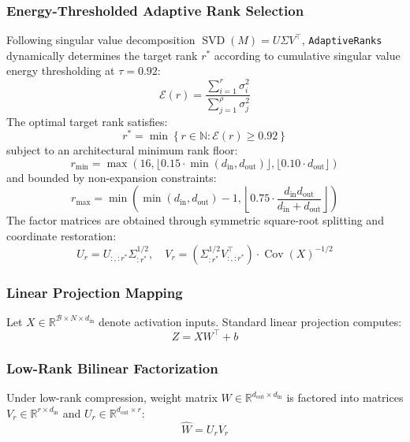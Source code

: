 \subsubsection{Energy-Thresholded Adaptive Rank Selection}
\label{sec:adaptive_rank_selection}
Following singular value decomposition $\operatorname{SVD}(M) = U \Sigma V^\top$, \texttt{AdaptiveRanks} dynamically determines the target rank $r^*$ according to cumulative singular value energy thresholding at $\tau = 0.92$:
\begin{equation}
\mathcal{E}(r) = \frac{\sum_{i=1}^r \sigma_i^2}{\sum_{j=1}^\rho \sigma_j^2}
\end{equation}
The optimal target rank satisfies:
\begin{equation}
r^* = \min \left\{ r \in \mathbb{N} : \mathcal{E}(r) \ge 0.92 \right\}
\end{equation}
subject to an architectural minimum rank floor:
\begin{equation}
r_{\min} = \max\left(16, \lfloor 0.15 \cdot \min(d_{\text{in}}, d_{\text{out}})\rfloor, \lfloor 0.10 \cdot d_{\text{out}}\rfloor\right)
\end{equation}
and bounded by non-expansion constraints:
\begin{equation}
r_{\max} = \min\left(\min(d_{\text{in}}, d_{\text{out}}) - 1, \left\lfloor 0.75 \cdot \frac{d_{\text{in}} d_{\text{out}}}{d_{\text{in}} + d_{\text{out}}}\right\rfloor\right)
\end{equation}
The factor matrices are obtained through symmetric square-root splitting and coordinate restoration:
\begin{equation}
U_r = U_{:, :r^*} \Sigma_{:r^*}^{1/2}, \quad V_r = \left(\Sigma_{:r^*}^{1/2} V_{:, :r^*}^\top\right) \cdot \operatorname{Cov}(X)^{-1/2}
\end{equation}

\subsubsection{Linear Projection Mapping}
Let $X \in \mathbb{R}^{\mathcal{B} \times N \times d_{\text{in}}}$ denote activation inputs. Standard linear projection computes:
\begin{equation}
Z = X W^\top + b
\end{equation}

\subsubsection{Low-Rank Bilinear Factorization}
Under low-rank compression, weight matrix $W \in \mathbb{R}^{d_{\text{out}} \times d_{\text{in}}}$ is factored into matrices $V_r \in \mathbb{R}^{r \times d_{\text{in}}}$ and $U_r \in \mathbb{R}^{d_{\text{out}} \times r}$:
\begin{equation}
\hat{W} = U_r V_r
\end{equation}

